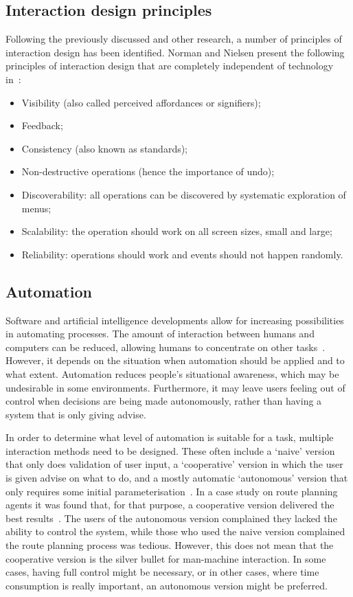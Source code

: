 \subsection[Principles]{Interaction design principles}
Following the previously discussed and other research, a number of principles of interaction design has been identified.
Norman and Nielsen present the following principles of interaction design that are completely independent of technology in~\cite{norman2010gestural}:
\begin{itemize}[noitemsep,topsep=0pt,parsep=0pt,partopsep=0pt]
\item Visibility (also called perceived affordances or signifiers);
\item Feedback;
\item Consistency (also known as standards);
\item Non-destructive operations (hence the importance of undo);
\item Discoverability: all operations can be discovered by systematic exploration of menus;
\item Scalability: the operation should work on all screen sizes, small and large;
\item Reliability: operations should work and events should not happen randomly.
\end{itemize}

\subsection{Automation}
Software and artificial intelligence developments allow for increasing possibilities in automating processes. The amount of interaction between humans and computers can be reduced, allowing humans to concentrate on other tasks~\cite{payne2000varying}. However, it depends on the situation when automation should be applied and to what extent. Automation reduces people's situational awareness, which may be undesirable in some environments. Furthermore, it may leave users feeling out of control when decisions are being made autonomously, rather than having a system that is only giving advise.

In order to determine what level of automation is suitable for a task, multiple interaction methods need to be designed. These often include a `naive' version that only does validation of user input, a `cooperative' version in which the user is given advise on what to do, and a mostly automatic `autonomous' version that only requires some initial parameterisation~\cite{payne2000varying,horvitz1999principles}. In a case study on route planning agents it was found that, for that purpose, a cooperative version delivered the best results~\cite{payne2000varying}. The users of the autonomous version complained they lacked the ability to control the system, while those who used the naive version complained the route planning process was tedious. However, this does not mean that the cooperative version is the silver bullet for man-machine interaction. In some cases, having full control might be necessary, or in other cases, where time consumption is really important, an autonomous version might be preferred.


